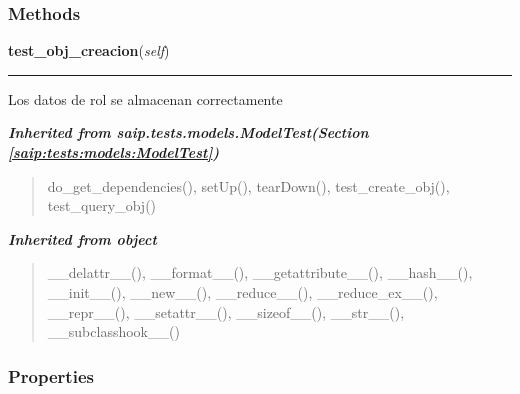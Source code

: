   \subsubsection{Methods}

    \label{saip:tests:models:test_rol:TestRol:test_obj_creacion}

    \vspace{0.5ex}

\hspace{.8\funcindent}\begin{boxedminipage}{\funcwidth}

    \raggedright \textbf{test\_obj\_creacion}(\textit{self})

    \vspace{-1.5ex}

    \rule{\textwidth}{0.5\fboxrule}
\setlength{\parskip}{2ex}
    Los datos de rol se almacenan correctamente

\setlength{\parskip}{1ex}
    \end{boxedminipage}


\large{\textbf{\textit{Inherited from saip.tests.models.ModelTest\textit{(Section \ref{saip:tests:models:ModelTest})}}}}

\begin{quote}
do\_get\_dependencies(), setUp(), tearDown(), test\_create\_obj(), test\_query\_obj()
\end{quote}

\large{\textbf{\textit{Inherited from object}}}

\begin{quote}
\_\_delattr\_\_(), \_\_format\_\_(), \_\_getattribute\_\_(), \_\_hash\_\_(), \_\_init\_\_(), \_\_new\_\_(), \_\_reduce\_\_(), \_\_reduce\_ex\_\_(), \_\_repr\_\_(), \_\_setattr\_\_(), \_\_sizeof\_\_(), \_\_str\_\_(), \_\_subclasshook\_\_()
\end{quote}


  \subsubsection{Properties}

